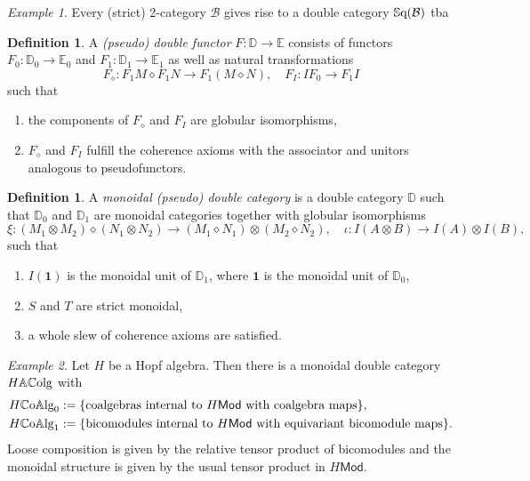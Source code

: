 \documentclass[11pt]{report}
\theoremstyle{definition}
\newtheorem{definition}[theorem]{Definition}
\theoremstyle{remark}
\theoremstyle{remark}
\newtheorem*{example}{Example}
\begin{document}
\begin{example}
Every (strict) 2-category $\mathcal{B}$ gives rise to a double category $\mathbb{S}\textnormal{q}(\mathcal{B})$ tba
\end{example}

\begin{definition}
A \emph{(pseudo) double functor} $F: \mathbb{D} \to \mathbb{E}$ consists of functors $F_0: \mathbb{D}_0 \to \mathbb{E}_0$ and $F_1: \mathbb{D}_1 \to \mathbb{E}_1$ as well as natural transformations
\begin{equation*}
F_\diamond: F_1 M \diamond F_1 N \to F_1(M \diamond N), \quad F_I: I F_0 \to F_1 I
\end{equation*}
such that
\begin{enumerate}[label=(\roman*)]
\item the components of $F_\diamond$ and $F_I$ are globular isomorphisms,
\item $F_\diamond$ and $F_I$ fulfill the coherence axioms with the associator and unitors analogous to pseudofunctors.
\end{enumerate}
\end{definition}

\begin{definition}
A \emph{monoidal (pseudo) double category} is a double category $\mathbb{D}$ such that $\mathbb{D}_0$ and $\mathbb{D}_1$ are monoidal categories together with globular isomorphisms
\begin{equation*}
\xi: (M_1 \otimes M_2) \diamond (N_1 \otimes N_2) \to (M_1 \diamond N_1) \otimes (M_2 \diamond N_2), \quad \iota: I(A \otimes B) \to I(A) \otimes I(B),
\end{equation*}
such that
\begin{enumerate}[label=(\roman*)]
\item $I(\mathbf{1})$ is the monoidal unit of $\mathbb{D}_1$, where $\mathbf{1}$ is the monoidal unit of $\mathbb{D}_0$,
\item $S$ and $T$ are strict monoidal,
\item a whole slew of coherence axioms are satisfied.
\end{enumerate}
\end{definition}

\begin{example}
Let $H$ be a Hopf algebra. Then there is a monoidal double category $H\mathbb{A}\mathbb{C}\textnormal{o}\textnormal{lg}$ with
\begin{align*}
H\mathbb{C}\textnormal{o}\mathbb{A}\textnormal{lg}_0 &:= \{ \text{coalgebras internal to } H\mathsf{Mod} \text{ with coalgebra maps} \}, \\
H\mathbb{C}\textnormal{o}\mathbb{A}\textnormal{lg}_1 &:= \{ \text{bicomodules internal to } H\mathsf{Mod} \text{ with equivariant bicomodule maps} \}.
\end{align*}
Loose composition is given by the relative tensor product of bicomodules and the monoidal structure is given by the usual tensor product in $H\mathsf{Mod}$.
\end{example}
\end{document}
